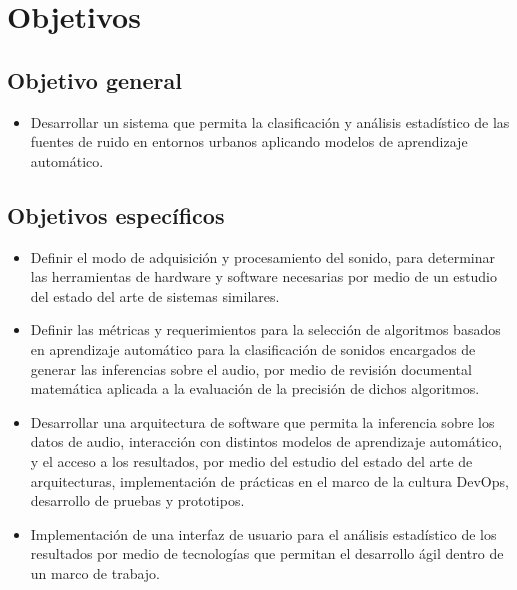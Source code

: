 \chapter{Objetivos}

\section{Objetivo general}
\begin{itemize}
    \item Desarrollar un sistema que permita la clasificación y análisis estadístico de las fuentes de ruido en entornos urbanos aplicando modelos de aprendizaje automático.
\end{itemize}
\section{Objetivos específicos}
\begin{itemize}
    \item Definir el modo de adquisición y procesamiento del sonido, para determinar las herramientas de hardware y software necesarias por medio de un estudio del estado del arte de sistemas similares.
    \item Definir las métricas y requerimientos para la selección de algoritmos basados en aprendizaje automático para la clasificación de sonidos encargados de generar las inferencias sobre el audio, por medio de revisión documental matemática aplicada a la evaluación de la precisión de dichos algoritmos.
    \item Desarrollar una arquitectura de software que permita la inferencia sobre los datos de  audio, interacción con distintos modelos de aprendizaje automático, y el acceso a los resultados, por medio del estudio del estado del arte de arquitecturas, implementación de prácticas en el marco de la cultura DevOps, desarrollo de pruebas y prototipos.
    \item Implementación de una interfaz de usuario para el análisis estadístico de los resultados por medio de tecnologías que permitan el desarrollo ágil dentro de un marco de trabajo. 
    
\end{itemize}